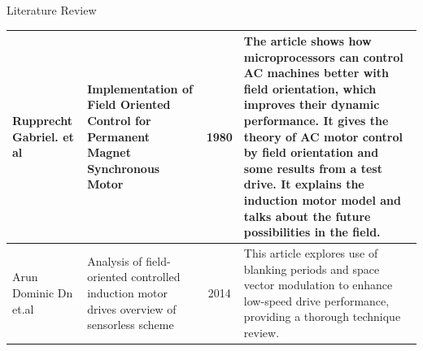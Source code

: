 \begin{frame}{Literature Review}
\begin{center}
\begin{table}
\begin{tabular}{|p{1.4cm}|p{}|c|p{6cm}|}
			\vspace{0.005in}  Rupprecht Gabriel. et al & \vspace{0.005in} Implementation of Field Oriented Control for Permanent Magnet Synchronous Motor & 1980 & \vspace{0.04in} \RaggedRight The article shows how microprocessors can control AC machines better with field orientation, which improves their dynamic performance. It gives the theory of AC motor control by field orientation and some results from a test drive. It explains the induction motor model and talks about the future possibilities in the field. \vspace{0.04in} \\
			\hline        
			\vspace{0.005in}  Arun Dominic Dn et.al & Analysis of field-oriented controlled induction motor drives overview of sensorless scheme & 2014 & \vspace{0.04in} \RaggedRight This article  explores use of blanking periods and space vector modulation to enhance low-speed drive performance, providing a thorough technique review.\\
			\hline
		\end{tabular}
		\label{tab:lit-survey}
	\end{table}
	\end{center}
	\end{frame}

